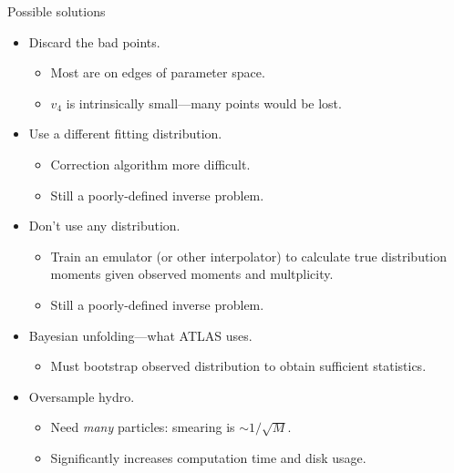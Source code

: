\documentclass{beamer}
\begin{document}
\begin{frame}{Possible solutions}
  \begin{itemize}
    \item Discard the bad points.
      \begin{itemize}
        \item Most are on edges of parameter space.
        \item $v_4$ is intrinsically small---many points would be lost.
      \end{itemize}
    \item Use a different fitting distribution.
      \begin{itemize}
        \item Correction algorithm more difficult.
        \item Still a poorly-defined inverse problem.
      \end{itemize}
    \item Don't use any distribution.
      \begin{itemize}
        \item Train an emulator (or other interpolator) to calculate true distribution moments given observed
          moments and multplicity.
        \item Still a poorly-defined inverse problem.
      \end{itemize}
    \item Bayesian unfolding---what ATLAS uses.
      \begin{itemize}
        \item Must bootstrap observed distribution to obtain sufficient statistics.
      \end{itemize}
    \item Oversample hydro.
      \begin{itemize}
        \item Need \emph{many} particles: smearing is $\sim 1/\sqrt M$.
        \item Significantly increases computation time and disk usage.
      \end{itemize}
  \end{itemize}
\end{frame}





\appendix

\def\backbutton#1{
  \tikz[remember picture,overlay]\node[anchor=south west] at (current page.south west) {\hyperlink{#1}{\footnotesize\color{theme}$\blacktriangleleft$}};
}
\end{document}
